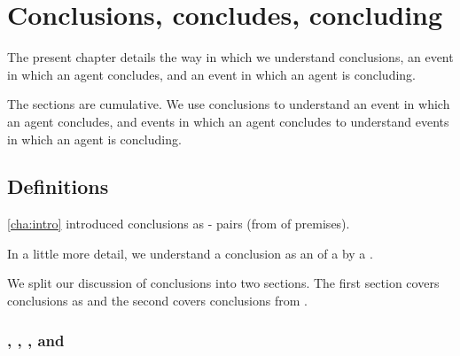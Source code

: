 \chapter{Conclusions, concludes, concluding}
\label{cha:clar}

\begin{note}
  The present chapter details the way in which we understand conclusions, an event in which an agent concludes, and an event in which an agent is concluding.




  The sections are cumulative.
  We use conclusions to understand an event in which an agent concludes, and events in which an agent concludes to understand events in which an agent is concluding.
\end{note}

\section{Definitions}
\label{cha:clar:sec:Cons}

\begin{note}
  \autoref{cha:intro} introduced conclusions as - pairs (from  of premises).

  In a little more detail, we understand a conclusion as an \eval{} of a  by a .
  

  We split our discussion of conclusions into two sections.
  The first section covers conclusions as  and the second covers conclusions from .
\end{note}

\subsection{, , , and }
\label{cha:clar:sec:Cons:pvp}

